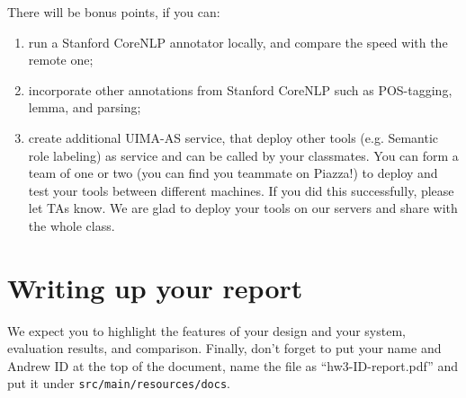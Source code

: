 There will be bonus points, if you can: 
\begin{enumerate}
  \item run a Stanford CoreNLP annotator locally, and compare the speed with the remote one;
  \item incorporate other annotations from Stanford CoreNLP such as POS-tagging, lemma, and parsing;
  \item create additional UIMA-AS service, that deploy other tools (e.g. Semantic role labeling) as service and 
can be called by your classmates. You can form a team of one or two (you can find you teammate on Piazza!) 
	to deploy and test your tools between different machines. 
If you did this successfully, please let TAs know. 
We are glad to deploy your tools on our servers and share with the whole class.
\end{enumerate}
  


\section{Writing up your report}

We expect you to highlight the features of your design and your system, evaluation results, and comparison.
Finally, don't forget to put your name and Andrew ID at the top of the document, name the
file as ``hw3-ID-report.pdf'' and put it under \texttt{src/main/resources/docs}.

